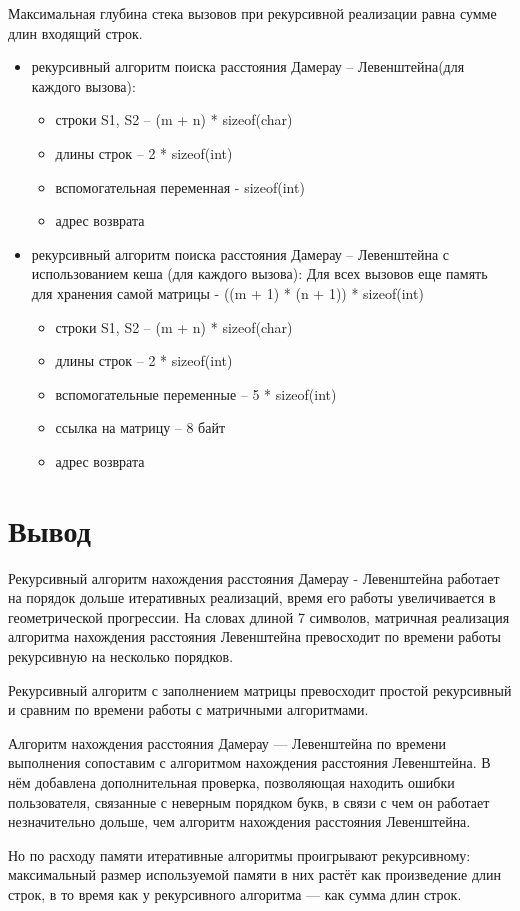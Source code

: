 Максимальная глубина стека вызовов при рекурсивной реализации равна сумме длин входящий строк.

\begin{itemize}
	\item рекурсивный алгоритм поиска расстояния Дамерау -- Левенштейна(для каждого вызова):
	\begin{itemize}
		\item строки S1, S2 -- (m + n) * sizeof(char)
		\item длины строк -- 2 * sizeof(int)
		\item вспомогательная переменная -  sizeof(int)
		\item адрес возврата
	\end{itemize}
	\item рекурсивный алгоритм поиска расстояния Дамерау -- Левенштейна с использованием кеша (для каждого вызова): Для всех вызовов еще память для хранения самой матрицы -  ((m + 1) * (n + 1)) * sizeof(int) \begin{itemize}
		\item строки S1, S2 -- (m + n) * sizeof(char)
		\item длины строк -- 2 * sizeof(int)
		\item вспомогательные переменные --  5 * sizeof(int)
		\item ссылка на матрицу -- 8 байт
		\item адрес возврата
	\end{itemize}
\end{itemize}


\section*{Вывод}

Рекурсивный алгоритм нахождения расстояния Дамерау - Левенштейна работает на порядок дольше итеративных реализаций, время его работы увеличивается в геометрической прогрессии. На словах длиной 7 символов, матричная реализация алгоритма нахождения расстояния Левенштейна превосходит по времени работы рекурсивную на несколько порядков.

Рекурсивный алгоритм с заполнением матрицы превосходит простой рекурсивный и сравним по времени работы с матричными алгоритмами. 

Алгоритм нахождения расстояния Дамерау — Левенштейна по времени выполнения сопоставим с алгоритмом нахождения расстояния Левенштейна. В нём добавлена дополнительная проверка, позволяющая находить ошибки пользователя, связанные с неверным порядком букв, в связи с чем он работает незначительно дольше, чем алгоритм нахождения расстояния Левенштейна.

Но по расходу памяти итеративные алгоритмы проигрывают рекурсивному: максимальный размер используемой памяти в них растёт как произведение длин строк, в то время как у рекурсивного алгоритма — как сумма длин строк.
